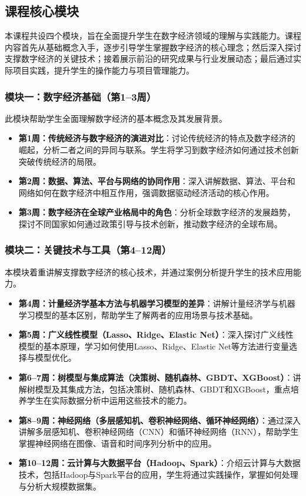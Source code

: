 \documentclass[lang=cn,12pt,a4paper]{elegantpaper}
\begin{document}
\subsection{课程核心模块} \label{sec:modules}
本课程共设四个模块，旨在全面提升学生在数字经济领域的理解与实践能力。课程内容首先从基础概念入手，逐步引导学生掌握数字经济的核心理念；然后深入探讨支撑数字经济的关键技术；接着展示前沿的研究成果与行业发展动态；最后通过实际项目实践，提升学生的操作能力与项目管理能力。

\subsubsection{模块一：数字经济基础（第1--3周）} \label{sec:module1}
此模块帮助学生全面理解数字经济的基本概念及其发展背景。
\begin{itemize}
    \item \textbf{第1周：传统经济与数字经济的演进对比}：讨论传统经济的特点及数字经济的崛起，分析二者之间的异同与联系。学生将学习到数字经济如何通过技术创新突破传统经济的局限。
    \item \textbf{第2周：数据、算法、平台与网络的协同作用}：深入讲解数据、算法、平台和网络如何在数字经济中相互作用，强调数据驱动经济活动的核心作用。
    \item \textbf{第3周：数字经济在全球产业格局中的角色}：分析全球数字经济的发展趋势，探讨不同国家如何通过政策引导与技术创新，推动数字经济的全球布局。
\end{itemize}

\subsubsection{模块二：关键技术与工具（第4--12周）} \label{sec:module2}
本模块着重讲解支撑数字经济的核心技术，并通过案例分析提升学生的技术应用能力。
\begin{itemize}
    \item \textbf{第4周：计量经济学基本方法与机器学习模型的差异}：讲解计量经济学与机器学习模型的基本区别，帮助学生了解两者的应用场景与技术基础。
    \item \textbf{第5周：广义线性模型（Lasso、Ridge、Elastic Net）}：深入探讨广义线性模型的基本原理，学习如何使用Lasso、Ridge、Elastic Net等方法进行变量选择与模型优化。
    \item \textbf{第6--7周：树模型与集成算法（决策树、随机森林、GBDT、XGBoost）}：讲解树模型及其集成方法，包括决策树、随机森林、GBDT和XGBoost，重点培养学生在实际数据分析中运用这些技术的能力。
    \item \textbf{第8--9周：神经网络（多层感知机、卷积神经网络、循环神经网络）}：通过深入讲解多层感知机、卷积神经网络（CNN）和循环神经网络（RNN），帮助学生掌握神经网络在图像、语音和时间序列分析中的应用。
    \item \textbf{第10--12周：云计算与大数据平台（Hadoop、Spark）}：介绍云计算与大数据技术，包括Hadoop与Spark平台的应用，学生将通过实践操作，掌握如何处理与分析大规模数据集。
\end{itemize}
\end{document}
